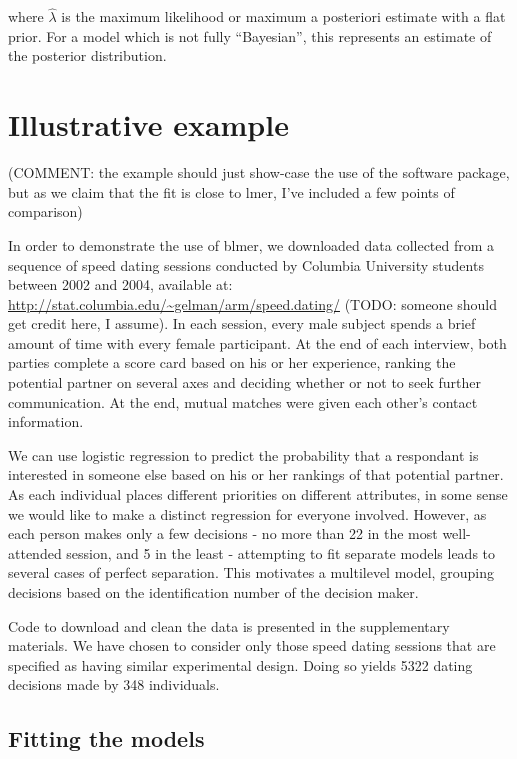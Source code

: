 \documentclass[10pt]{article}
\newcommand{\pkg}[1]{{\fontseries{b}\selectfont #1}}
\begin{document}
\noindent where $\hat\lambda$ is the maximum likelihood or maximum a
posteriori estimate with a flat prior. For a model which is not
fully ``Bayesian'', this represents an estimate of the posterior
distribution.

\section{Illustrative example}

(COMMENT: the example should just show-case the use of the
software package, but as we claim that the fit is close to lmer, I've
included a few points of comparison)

In order to demonstrate the use of \pkg{blmer}, we downloaded data collected from a sequence of speed dating sessions
conducted by Columbia University students between 2002 and 2004, available at:
\url{http://stat.columbia.edu/~gelman/arm/speed.dating/} (TODO: someone
should get credit here, I assume). In each
session, every male subject spends a brief amount of time with every
female participant. At the end of each interview, both parties complete a score
card based on his or her experience, ranking the potential partner on several
axes and deciding whether or not to seek further communication. At the
end, mutual matches were given each other's contact information.

We can use logistic regression to predict the probability
that a respondant is interested in someone else based on his or her
rankings of that potential partner.  As each individual places
different priorities on different attributes, in some sense we would
like to make a distinct regression for everyone involved. However, as
each person makes only a few decisions - no more than 22 in the most
well-attended session, and 5 in the least - attempting to fit separate models leads to
several cases of perfect separation. This motivates a multilevel
model, grouping decisions based on the identification number of the
decision maker.

Code to download and clean the data is presented in the supplementary
materials. We have chosen to consider only those speed dating sessions
that are specified as having similar experimental design. Doing so
yields 5322 dating decisions made by 348 individuals.

\subsection{Fitting the models}
\end{document}

